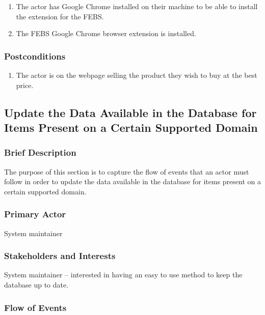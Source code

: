 \documentclass[12pt,a4paper,twoside]{report}
\begin{document}
\begin{enumerate}
  \item The actor has Google Chrome installed on their machine to be able to install the extension for the FEBS.
  \item The FEBS Google Chrome browser extension is installed.
\end{enumerate}


\subsubsection{Postconditions}

\begin{enumerate}
  \item The actor is on the webpage selling the product they wish to buy at the best price.
\end{enumerate}


\subsection{Update the Data Available in the Database for Items Present on a Certain Supported Domain} \label{subsec:use_case_crawl_update_database}

\subsubsection{Brief Description}

The purpose of this section is to capture the flow of events that an actor must follow in order to update the data available in the database for items present on a certain supported domain.


\subsubsection{Primary Actor}

System maintainer


\subsubsection{Stakeholders and Interests}

System maintainer – interested in having an easy to use method to keep the database up to date.


\subsubsection{Flow of Events}
\end{document}
